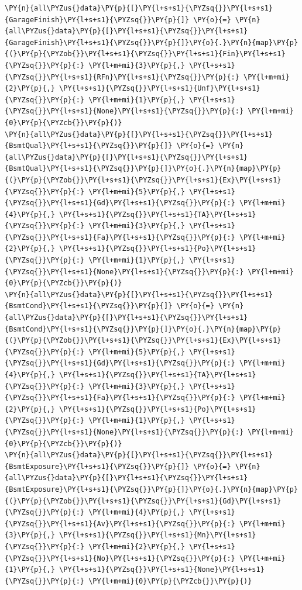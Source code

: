 \documentclass[no-math]{YangThesis}
\begin{document}
\begin{tcolorbox}[breakable, size=fbox, boxrule=1pt, pad at break*=1mm,colback=cellbackground, colframe=cellborder]
\begin{Verbatim}[commandchars=\\\{\}]
\PY{n}{all\PYZus{}data}\PY{p}{[}\PY{l+s+s1}{\PYZsq{}}\PY{l+s+s1}{GarageFinish}\PY{l+s+s1}{\PYZsq{}}\PY{p}{]} \PY{o}{=} \PY{n}{all\PYZus{}data}\PY{p}{[}\PY{l+s+s1}{\PYZsq{}}\PY{l+s+s1}{GarageFinish}\PY{l+s+s1}{\PYZsq{}}\PY{p}{]}\PY{o}{.}\PY{n}{map}\PY{p}{(}\PY{p}{\PYZob{}}\PY{l+s+s1}{\PYZsq{}}\PY{l+s+s1}{Fin}\PY{l+s+s1}{\PYZsq{}}\PY{p}{:} \PY{l+m+mi}{3}\PY{p}{,} \PY{l+s+s1}{\PYZsq{}}\PY{l+s+s1}{RFn}\PY{l+s+s1}{\PYZsq{}}\PY{p}{:} \PY{l+m+mi}{2}\PY{p}{,} \PY{l+s+s1}{\PYZsq{}}\PY{l+s+s1}{Unf}\PY{l+s+s1}{\PYZsq{}}\PY{p}{:} \PY{l+m+mi}{1}\PY{p}{,} \PY{l+s+s1}{\PYZsq{}}\PY{l+s+s1}{None}\PY{l+s+s1}{\PYZsq{}}\PY{p}{:} \PY{l+m+mi}{0}\PY{p}{\PYZcb{}}\PY{p}{)}
\PY{n}{all\PYZus{}data}\PY{p}{[}\PY{l+s+s1}{\PYZsq{}}\PY{l+s+s1}{BsmtQual}\PY{l+s+s1}{\PYZsq{}}\PY{p}{]} \PY{o}{=} \PY{n}{all\PYZus{}data}\PY{p}{[}\PY{l+s+s1}{\PYZsq{}}\PY{l+s+s1}{BsmtQual}\PY{l+s+s1}{\PYZsq{}}\PY{p}{]}\PY{o}{.}\PY{n}{map}\PY{p}{(}\PY{p}{\PYZob{}}\PY{l+s+s1}{\PYZsq{}}\PY{l+s+s1}{Ex}\PY{l+s+s1}{\PYZsq{}}\PY{p}{:} \PY{l+m+mi}{5}\PY{p}{,} \PY{l+s+s1}{\PYZsq{}}\PY{l+s+s1}{Gd}\PY{l+s+s1}{\PYZsq{}}\PY{p}{:} \PY{l+m+mi}{4}\PY{p}{,} \PY{l+s+s1}{\PYZsq{}}\PY{l+s+s1}{TA}\PY{l+s+s1}{\PYZsq{}}\PY{p}{:} \PY{l+m+mi}{3}\PY{p}{,} \PY{l+s+s1}{\PYZsq{}}\PY{l+s+s1}{Fa}\PY{l+s+s1}{\PYZsq{}}\PY{p}{:} \PY{l+m+mi}{2}\PY{p}{,} \PY{l+s+s1}{\PYZsq{}}\PY{l+s+s1}{Po}\PY{l+s+s1}{\PYZsq{}}\PY{p}{:} \PY{l+m+mi}{1}\PY{p}{,} \PY{l+s+s1}{\PYZsq{}}\PY{l+s+s1}{None}\PY{l+s+s1}{\PYZsq{}}\PY{p}{:} \PY{l+m+mi}{0}\PY{p}{\PYZcb{}}\PY{p}{)}
\PY{n}{all\PYZus{}data}\PY{p}{[}\PY{l+s+s1}{\PYZsq{}}\PY{l+s+s1}{BsmtCond}\PY{l+s+s1}{\PYZsq{}}\PY{p}{]} \PY{o}{=} \PY{n}{all\PYZus{}data}\PY{p}{[}\PY{l+s+s1}{\PYZsq{}}\PY{l+s+s1}{BsmtCond}\PY{l+s+s1}{\PYZsq{}}\PY{p}{]}\PY{o}{.}\PY{n}{map}\PY{p}{(}\PY{p}{\PYZob{}}\PY{l+s+s1}{\PYZsq{}}\PY{l+s+s1}{Ex}\PY{l+s+s1}{\PYZsq{}}\PY{p}{:} \PY{l+m+mi}{5}\PY{p}{,} \PY{l+s+s1}{\PYZsq{}}\PY{l+s+s1}{Gd}\PY{l+s+s1}{\PYZsq{}}\PY{p}{:} \PY{l+m+mi}{4}\PY{p}{,} \PY{l+s+s1}{\PYZsq{}}\PY{l+s+s1}{TA}\PY{l+s+s1}{\PYZsq{}}\PY{p}{:} \PY{l+m+mi}{3}\PY{p}{,} \PY{l+s+s1}{\PYZsq{}}\PY{l+s+s1}{Fa}\PY{l+s+s1}{\PYZsq{}}\PY{p}{:} \PY{l+m+mi}{2}\PY{p}{,} \PY{l+s+s1}{\PYZsq{}}\PY{l+s+s1}{Po}\PY{l+s+s1}{\PYZsq{}}\PY{p}{:} \PY{l+m+mi}{1}\PY{p}{,} \PY{l+s+s1}{\PYZsq{}}\PY{l+s+s1}{None}\PY{l+s+s1}{\PYZsq{}}\PY{p}{:} \PY{l+m+mi}{0}\PY{p}{\PYZcb{}}\PY{p}{)}
\PY{n}{all\PYZus{}data}\PY{p}{[}\PY{l+s+s1}{\PYZsq{}}\PY{l+s+s1}{BsmtExposure}\PY{l+s+s1}{\PYZsq{}}\PY{p}{]} \PY{o}{=} \PY{n}{all\PYZus{}data}\PY{p}{[}\PY{l+s+s1}{\PYZsq{}}\PY{l+s+s1}{BsmtExposure}\PY{l+s+s1}{\PYZsq{}}\PY{p}{]}\PY{o}{.}\PY{n}{map}\PY{p}{(}\PY{p}{\PYZob{}}\PY{l+s+s1}{\PYZsq{}}\PY{l+s+s1}{Gd}\PY{l+s+s1}{\PYZsq{}}\PY{p}{:} \PY{l+m+mi}{4}\PY{p}{,} \PY{l+s+s1}{\PYZsq{}}\PY{l+s+s1}{Av}\PY{l+s+s1}{\PYZsq{}}\PY{p}{:} \PY{l+m+mi}{3}\PY{p}{,} \PY{l+s+s1}{\PYZsq{}}\PY{l+s+s1}{Mn}\PY{l+s+s1}{\PYZsq{}}\PY{p}{:} \PY{l+m+mi}{2}\PY{p}{,} \PY{l+s+s1}{\PYZsq{}}\PY{l+s+s1}{No}\PY{l+s+s1}{\PYZsq{}}\PY{p}{:} \PY{l+m+mi}{1}\PY{p}{,} \PY{l+s+s1}{\PYZsq{}}\PY{l+s+s1}{None}\PY{l+s+s1}{\PYZsq{}}\PY{p}{:} \PY{l+m+mi}{0}\PY{p}{\PYZcb{}}\PY{p}{)}

\end{Verbatim}
\end{tcolorbox}
\end{document}
